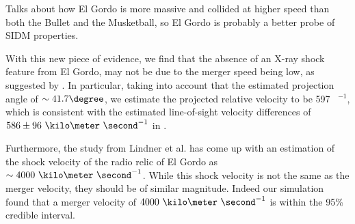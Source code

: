 
Talks about how El Gordo is more massive and collided at higher speed than
both the Bullet and the Musketball, so El Gordo is probably a better probe of SIDM properties.
%
%

With this new piece of evidence, we find that the absence of an
X-ray shock feature from El Gordo, may not be due to the merger speed being
low, as suggested by . 
In particular, taking into account that the estimated projection angle of 
$\sim 41.7\degree$, we estimate the projected relative velocity to be 597
\kilo \meter~\second$^{-1}$, which is consistent with the estimated
line-of-sight velocity differences of $586 \pm  96~\kilo \meter
~\second^{-1}$ in . 

Furthermore, the study from \cite{L13} Lindner et al. has come up
with an estimation of the shock velocity of the radio relic of El Gordo as 
$\sim 4000~\kilo \meter~\second^{-1}$. While this shock velocity is not the
same as the merger velocity, they should be of similar magnitude. Indeed
our simulation found that a merger velocity of $4000~\kilo
\meter~\second^{-1}$ is within the 95\% credible interval. 
